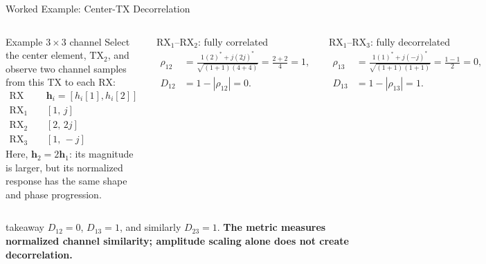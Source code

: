 \begin{frame}{Worked Example: Center-TX Decorrelation}
\scriptsize
\begin{columns}[T,onlytextwidth]
  \begin{block}{Example $3\!\times\!3$ channel}
    Select the center element, $\mathrm{TX}_2$, and observe two channel samples
    from this TX to each RX:
    \[
      \begin{array}{c|c}
        \text{RX branch} & \mathbf h_i=[h_i[1],h_i[2]]\\ \hline
        \mathrm{RX}_1 & [1,\,j]\\
        \mathrm{RX}_2 & [2,\,2j]\\
        \mathrm{RX}_3 & [1,\,-j]
      \end{array}
    \]
    Here, $\mathbf h_2=2\mathbf h_1$: its magnitude is larger, but its
    normalized response has the same shape and phase progression.
  \end{block}

  \begin{block}{RX$_1$--RX$_2$: fully correlated}
    \begin{align*}
      \rho_{12}
      &=\frac{1(2)^*+j(2j)^*}
      {\sqrt{(1+1)(4+4)}}
      =\frac{2+2}{4}=1,\\[-0.2em]
      D_{12}&=1-|\rho_{12}|=0.
    \end{align*}
  \end{block}

  \begin{block}{RX$_1$--RX$_3$: fully decorrelated}
    \begin{align*}
      \rho_{13}
      &=\frac{1(1)^*+j(-j)^*}
      {\sqrt{(1+1)(1+1)}}
      =\frac{1-1}{2}=0,\\[-0.2em]
      D_{13}&=1-|\rho_{13}|=1.
    \end{align*}
  \end{block}
\end{columns}

\vspace{-0.07cm}
\begin{beamercolorbox}[rounded=true,sep=0.6ex,wd=\linewidth]{takeaway}
  \centering
  $D_{12}=0$, $D_{13}=1$, and similarly $D_{23}=1$.
  \textbf{The metric measures normalized channel similarity; amplitude scaling
  alone does not create decorrelation.}
\end{beamercolorbox}
\end{frame}



